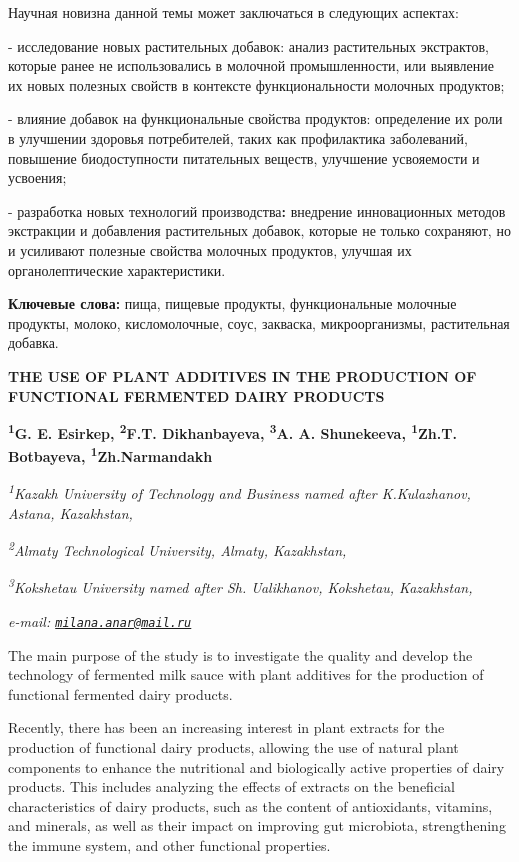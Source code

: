 Научная новизна данной темы может заключаться в следующих
аспектах:

- исследование новых растительных добавок: анализ растительных
экстрактов, которые ранее не использовались в молочной промышленности,
или выявление их новых полезных свойств в контексте функциональности
молочных продуктов;

- влияние добавок на функциональные свойства продуктов:
определение их роли в улучшении здоровья потребителей, таких как
профилактика заболеваний, повышение биодоступности питательных веществ,
улучшение усвояемости и усвоения;

- разработка новых технологий производства{\bfseries :} внедрение
инновационных методов экстракции и добавления растительных добавок,
которые не только сохраняют, но и усиливают полезные свойства молочных
продуктов, улучшая их органолептические характеристики.

{\bfseries Ключевые слова:} пища, пищевые продукты, функциональные молочные
продукты, молоко, кисломолочные, соус, закваска, микроорганизмы,
растительная добавка.

\begin{articleheader}
{\bfseries THE USE OF PLANT ADDITIVES IN THE PRODUCTION OF FUNCTIONAL FERMENTED DAIRY PRODUCTS}

{\bfseries
\textsuperscript{1}G. E. Esirkep\textsuperscript{\envelope },
\textsuperscript{2}F.T. Dikhanbayeva,
\textsuperscript{3}A. A. Shunekeeva,
\textsuperscript{1}Zh.T. Botbayeva,
\textsuperscript{1}Zh.Narmandakh}
\end{articleheader}

\begin{affiliation}
\emph{\textsuperscript{1}Kazakh University of Technology and Business named after K.Kulazhanov, Astana, Kazakhstan,}

\emph{\textsuperscript{2}Almaty Technological University, Almaty, Kazakhstan,}

\emph{\textsuperscript{3}Kokshetau University named after Sh. Ualikhanov, Kokshetau, Kazakhstan,}

\emph{e-mail: \href{mailto:milana.anar@mail.ru}{\nolinkurl{milana.anar@mail.ru}}}
\end{affiliation}

The main purpose of the study is to investigate the quality and develop
the technology of fermented milk sauce with plant additives for the
production of functional fermented dairy products.

Recently, there has been an increasing interest in plant extracts for
the production of functional dairy products, allowing the use of natural
plant components to enhance the nutritional and biologically active
properties of dairy products. This includes analyzing the effects of
extracts on the beneficial characteristics of dairy products, such as
the content of antioxidants, vitamins, and minerals, as well as their
impact on improving gut microbiota, strengthening the immune system, and
other functional properties.

